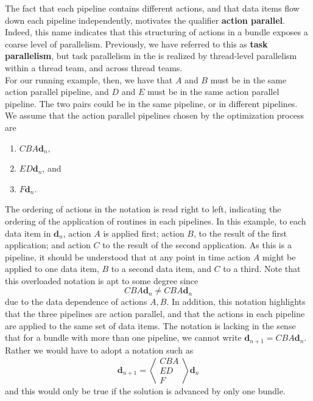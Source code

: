 \documentclass{article}
\begin{document}
The fact that each pipeline contains different actions, and
that data items flow down each pipeline independently, motivates the qualifier
\textbf{action parallel}.  Indeed, this name indicates that this structuring of actions
in a bundle exposes a coarse level of parallelism.  Previously, we have referred
to this as \textbf{task parallelism}, but task parallelism in the \OR is realized by
thread-level parallelism within a thread team, and across thread teams.\\

For our running example, then, we have that $A$ and $B$ must be in the
same action parallel pipeline, and $D$ and $E$ must be in the same action parallel
pipeline.  The two pairs could be in the same pipeline, or in different
pipelines.  We assume that the action parallel pipelines chosen by the
optimization process are
\begin{enumerate}
\item{$CBA\mathbf{d}_n$},
\item{$ED\mathbf{d}_n$}, and
\item{$F\mathbf{d}_n$}.
\end{enumerate}
The ordering of actions in the notation is read right to left,
indicating the ordering of the application of routines in each
pipelines.  In this example, to each data item
in $\mathbf{d}_n$, action $A$ is applied first; action $B$, to the result of
the first application; and action $C$ to the result of the second
application.  As this is a pipeline, it should be understood that at any point
in time action $A$ might be applied to one data item, $B$ to a second data item,
and $C$ to a third.  Note that this overloaded notation is apt to some degree since
\[
CBA\mathbf{d}_n \not= CBA\mathbf{d}_n
\]
due to the data dependence of actions $A,B$.  In addition, this notation
highlights that the three pipelines are action parallel, and that the actions in
each pipeline are applied to the same set of data items.  The notation is lacking in the
sense that for a bundle with more than one pipeline, we cannot write
$\mathbf{d}_{n+1} = CBA\mathbf{d}_n$.  Rather we would have to adopt a notation
such as
\[
\mathbf{d}_{n+1} =
\left\langle
\begin{array}{c}
CBA\\
ED\\
F
\end{array}
\right\rangle
\mathbf{d}_n
\]
and this would only be true if the solution is advanced by only one bundle.
\\
\end{document}
